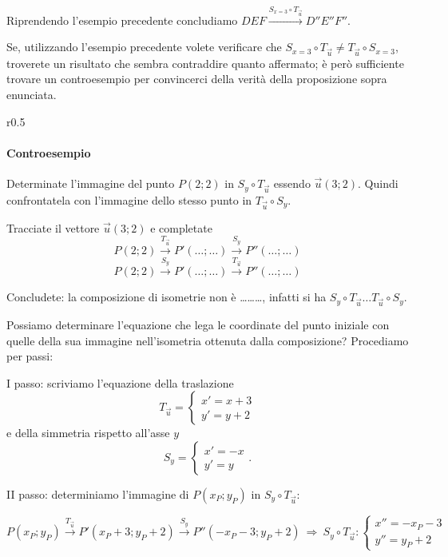 Riprendendo l'esempio precedente concludiamo \(DEF \overset{S_{x=3} 
  \circ T_{\vec{u}}}\longrightarrow D''E''F''\).

Se, utilizzando l'esempio precedente volete verificare che 
\(S_{x=3}\circ T_{\vec{u}} \neq T_{\vec{u}}\circ S_{x=3}\), troverete 
un risultato che sembra contraddire quanto affermato; è però 
sufficiente trovare un controesempio per convincerci della verità 
della proposizione sopra enunciata.


\setlength{\intextsep}{3pt plus 2.0pt minus 2.0pt}
\begin{wrapfigure}{r}{0.5\textwidth}
  \centering
\end{wrapfigure}
\paragraph{Controesempio}
Determinate l'immagine del punto \(P(2;2)\) in \(S_y \circ T_{\vec{u}}\) 
essendo \(\vec{u}(3;2)\). Quindi confrontatela con l'immagine dello 
stesso punto in \(T_{\vec{u}}\circ S_y\).\vspace{7pt}

Tracciate il vettore \(\vec{u}(3;2)\) e completate
\[P(2;2) \overset{T_{\vec{u}}}\rightarrow P'(\ldots{};\ldots{}) 
\overset{S_y}\rightarrow P''(\ldots{};\ldots{})\]
\[P(2;2) \overset{S_y}\rightarrow P'(\ldots{};\ldots{}) 
\overset{T_{\vec{u}}}\rightarrow P''(\ldots{};\ldots{})\]

Concludete: la composizione di isometrie non è \ldots\ldots\ldots{}, 
infatti si ha \(S_y \circ T_{\vec{u}} \ldots{} T_{\vec{u}} \circ S_y\).

Possiamo determinare l'equazione che lega le coordinate del punto 
iniziale con quelle della sua immagine nell'isometria ottenuta dalla 
composizione? Procediamo per passi:

I passo: scriviamo l'equazione della traslazione 
\[T_{\vec{u}}=\begin{cases}x'=x+3\\y'=y+2\end{cases}\]
\indent e della simmetria rispetto all'asse \(y\) 
\[S_y=\begin{cases}x'=-x\\y'=y\end{cases}.\]

II passo: determiniamo l'immagine di \(P(x_P;y_P)\) in \(S_y \circ 
T_{\vec{u}}\):

\[P(x_P;y_P)\overset{T_{\vec{u}}}\rightarrow P'(x_P+3;y_P+2) 
\overset{S_y}\rightarrow P''(-x_P-3;y_P+2)\:\Rightarrow\: S_y\circ 
T_{\vec{u}}:\begin{cases}x''=-x_P-3\\ y''=y_P+2\end{cases}\]

